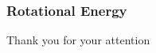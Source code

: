 \documentclass{beamer}
\begin{document}
\begin{frame}
	\frametitle{Rotational Energy}
	
\end{frame}





\begin{frame}[plain] %
	\begin{center}
		\bigskip\bigskip %
		{\Huge Thank you for your attention \faHeart}
	\end{center}
\end{frame}
\end{document}

